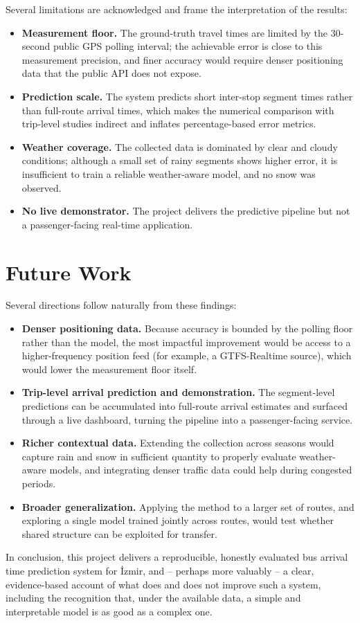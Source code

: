 Several limitations are acknowledged and frame the interpretation of the results:

\begin{itemize}
    \item \textbf{Measurement floor.} The ground-truth travel times are limited by the 30-second public GPS polling interval; the achievable error is close to this measurement precision, and finer accuracy would require denser positioning data that the public API does not expose.
    \item \textbf{Prediction scale.} The system predicts short inter-stop segment times rather than full-route arrival times, which makes the numerical comparison with trip-level studies indirect and inflates percentage-based error metrics.
    \item \textbf{Weather coverage.} The collected data is dominated by clear and cloudy conditions; although a small set of rainy segments shows higher error, it is insufficient to train a reliable weather-aware model, and no snow was observed.
    \item \textbf{No live demonstrator.} The project delivers the predictive pipeline but not a passenger-facing real-time application.
\end{itemize}

\section{Future Work}

Several directions follow naturally from these findings:

\begin{itemize}
    \item \textbf{Denser positioning data.} Because accuracy is bounded by the polling floor rather than the model, the most impactful improvement would be access to a higher-frequency position feed (for example, a GTFS-Realtime source), which would lower the measurement floor itself.
    \item \textbf{Trip-level arrival prediction and demonstration.} The segment-level predictions can be accumulated into full-route arrival estimates and surfaced through a live dashboard, turning the pipeline into a passenger-facing service.
    \item \textbf{Richer contextual data.} Extending the collection across seasons would capture rain and snow in sufficient quantity to properly evaluate weather-aware models, and integrating denser traffic data could help during congested periods.
    \item \textbf{Broader generalization.} Applying the method to a larger set of routes, and exploring a single model trained jointly across routes, would test whether shared structure can be exploited for transfer.
\end{itemize}

In conclusion, this project delivers a reproducible, honestly evaluated bus arrival time prediction system for İzmir, and -- perhaps more valuably -- a clear, evidence-based account of what does and does not improve such a system, including the recognition that, under the available data, a simple and interpretable model is as good as a complex one.
